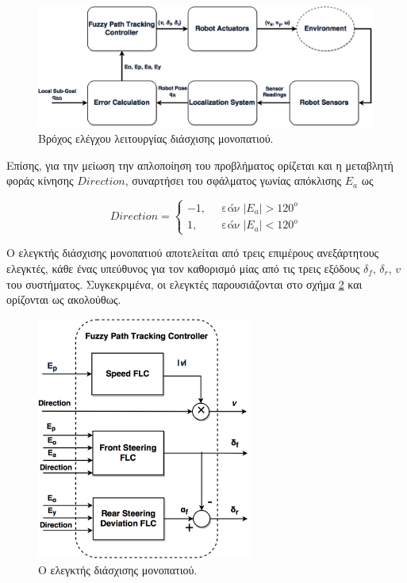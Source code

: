 \bigskip
\begin{figure}[!ht]
	\centering
	\includegraphics[width=0.8\linewidth]{Chapters/Chapter3/Figures/ptc_block_diagram.png}
	\caption{Βρόχος ελέγχου λειτουργίας διάσχισης μονοπατιού.}
	\label{fig:ptc_block_diagram}
\end{figure}

\bigskip
Επίσης, για την μείωση την απλοποίηση του προβλήματος ορίζεται και η μεταβλητή φοράς κίνησης $Direction$, συναρτήσει του σφάλματος γωνίας απόκλισης $E_a$ ως

\begin{equation}
	\textit{Direction} =
		\begin{cases}
			-1,\;\; &\text{εάν}\; |E_a| > 120^o\\
			1, \;\; &\text{εάν}\; |E_a| < 120^o
		\end{cases}
\end{equation}

\bigskip
Ο ελεγκτής διάσχισης μονοπατιού αποτελείται από τρεις επιμέρους ανεξάρτητους ελεγκτές, κάθε ένας υπεύθυνος για τον καθορισμό μίας από τις τρεις εξόδους $\delta_f$, $\delta_r$, $v$ του συστήματος. Συγκεκριμένα, οι ελεγκτές παρουσιάζονται στο σχήμα \ref{fig:fuzzy_ptc_inside} και ορίζονται ως ακολούθως.


\begin{figure}[!ht]
	\centering
	\includegraphics[height=8cm]{Chapters/Chapter3/Figures/fuzzy_ptc_inside.png}
	\caption{Ο ελεγκτής διάσχισης μονοπατιού.}
	\label{fig:fuzzy_ptc_inside}
\end{figure}

